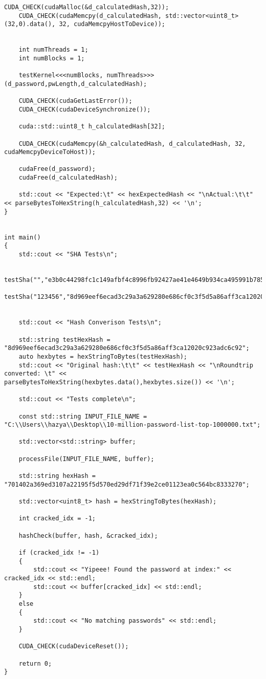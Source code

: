 \documentclass[12pt]{report}%
\theoremstyle{definition}
\begin{document}
\begin{lstlisting}[caption={Paroļu lauzēja implementācija CUDA vidē},
  label=lst:cuda_impl,
  captionpos=t
  ]
    CUDA_CHECK(cudaMalloc(&d_calculatedHash,32));
    CUDA_CHECK(cudaMemcpy(d_calculatedHash, std::vector<uint8_t>(32,0).data(), 32, cudaMemcpyHostToDevice));


    int numThreads = 1;
    int numBlocks = 1;

    testKernel<<<numBlocks, numThreads>>>(d_password,pwLength,d_calculatedHash);
    
    CUDA_CHECK(cudaGetLastError());
    CUDA_CHECK(cudaDeviceSynchronize());

    cuda::std::uint8_t h_calculatedHash[32];

    CUDA_CHECK(cudaMemcpy(&h_calculatedHash, d_calculatedHash, 32, cudaMemcpyDeviceToHost));

    cudaFree(d_password);
    cudaFree(d_calculatedHash);

    std::cout << "Expected:\t" << hexExpectedHash << "\nActual:\t\t" << parseBytesToHexString(h_calculatedHash,32) << '\n';
}


int main()
{
    std::cout << "SHA Tests\n";
    
    testSha("","e3b0c44298fc1c149afbf4c8996fb92427ae41e4649b934ca495991b7852b855");
    testSha("123456","8d969eef6ecad3c29a3a629280e686cf0c3f5d5a86aff3ca12020c923adc6c92");


    std::cout << "Hash Converison Tests\n";

    std::string testHexHash = "8d969eef6ecad3c29a3a629280e686cf0c3f5d5a86aff3ca12020c923adc6c92";
    auto hexbytes = hexStringToBytes(testHexHash);
    std::cout << "Original hash:\t\t" << testHexHash << "\nRoundtrip converted: \t" << parseBytesToHexString(hexbytes.data(),hexbytes.size()) << '\n';

    std::cout << "Tests complete\n";

    const std::string INPUT_FILE_NAME = "C:\\Users\\hazya\\Desktop\\10-million-password-list-top-1000000.txt";

    std::vector<std::string> buffer;

    processFile(INPUT_FILE_NAME, buffer);

    std::string hexHash = "701402a369ed3107a22195f5d570ed29df71f39e2ce01123ea0c564bc8333270";

    std::vector<uint8_t> hash = hexStringToBytes(hexHash);

    int cracked_idx = -1;

    hashCheck(buffer, hash, &cracked_idx);

    if (cracked_idx != -1)
    {
        std::cout << "Yipeee! Found the password at index:" << cracked_idx << std::endl;
        std::cout << buffer[cracked_idx] << std::endl;
    }
    else
    {
        std::cout << "No matching passwords" << std::endl;
    }

    CUDA_CHECK(cudaDeviceReset());

    return 0; 
}
\end{lstlisting}
\end{document}
